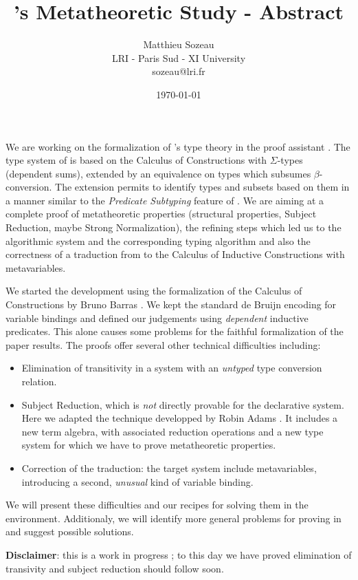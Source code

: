 \documentclass{article}
\title{\Russell's Metatheoretic Study - Abstract}
\date{\today}
\author{Matthieu Sozeau \\
  LRI - Paris Sud - XI University \\
  sozeau@lri.fr}
\begin{document}
\maketitle

We are working on the formalization of \Russell{}'s type theory in the
\Coq{} proof assistant \cite{sozeau:coq/Russell/meta}.
The type system of \Russell{} is based on the
Calculus of Constructions with $\Sigma$-types (dependent sums), extended by an equivalence on types
which subsumes $\beta$-conversion. The extension permits to identify
types and subsets based on them in a manner similar to the
\emph{Predicate Subtyping} feature of \PVS{}. We are aiming at 
a complete proof of \Russell{} metatheoretic properties (structural
properties, Subject Reduction, maybe Strong Normalization), the
refining steps which
led us to the algorithmic system and the corresponding typing algorithm and also the correctness of a
traduction from \Russell{} to the Calculus of Inductive Constructions
with metavariables.

We started the development using the formalization of the
Calculus of Constructions by Bruno Barras \cite{Barras96a}.
We kept the standard de Bruijn encoding for variable bindings and
defined our judgements using \emph{dependent} inductive predicates.
This alone causes some problems for the faithful formalization of the
paper results.  
The proofs offer several other technical difficulties including:
\begin{itemize}
\item Elimination of transitivity in a system with an \emph{untyped} type
  conversion relation.

\item Subject Reduction, which is \emph{not} directly provable for the
  declarative system. Here we adapted the technique developped by
  Robin Adams \cite{adams:PTSEQ}. It includes a new term algebra, with
  associated reduction operations and a new type system
  for which we have to prove metatheoretic properties.

\item Correction of the traduction: the target system include
  metavariables, introducing a second, \emph{unusual} kind of variable binding.
\end{itemize}

We will present these difficulties and our recipes for solving them in
the \Coq environment. Additionaly, we will identify more general problems for
proving in \Coq and suggest possible solutions. 

{\bf Disclaimer}: this is a work in
progress ; to this day we have proved elimination of transivity and
subject reduction should follow soon.




\end{document}
